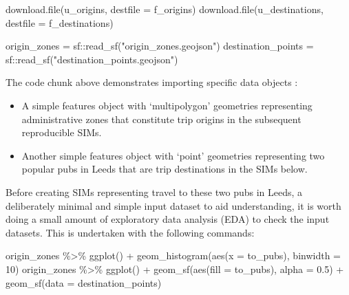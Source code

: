 \documentclass[11pt,letterpaper]{article}
\newenvironment{Shaded}{\begin{snugshade}}{\end{snugshade}}
\newcommand{\AttributeTok}[1]{\textcolor[rgb]{0.77,0.63,0.00}{#1}}
\newcommand{\DecValTok}[1]{\textcolor[rgb]{0.00,0.00,0.81}{#1}}
\newcommand{\FloatTok}[1]{\textcolor[rgb]{0.00,0.00,0.81}{#1}}
\newcommand{\FunctionTok}[1]{\textcolor[rgb]{0.00,0.00,0.00}{#1}}
\newcommand{\NormalTok}[1]{#1}
\newcommand{\OtherTok}[1]{\textcolor[rgb]{0.56,0.35,0.01}{#1}}
\newcommand{\SpecialCharTok}[1]{\textcolor[rgb]{0.00,0.00,0.00}{#1}}
\newcommand{\StringTok}[1]{\textcolor[rgb]{0.31,0.60,0.02}{#1}}
\begin{document}
\begin{Shaded}
\begin{Highlighting}[]
\FunctionTok{download.file}\NormalTok{(u\_origins, }\AttributeTok{destfile =}\NormalTok{ f\_origins)}
\FunctionTok{download.file}\NormalTok{(u\_destinations, }\AttributeTok{destfile =}\NormalTok{ f\_destinations)}
\end{Highlighting}
\end{Shaded}

\begin{Shaded}
\begin{Highlighting}[]
\NormalTok{origin\_zones }\OtherTok{=}\NormalTok{ sf}\SpecialCharTok{::}\FunctionTok{read\_sf}\NormalTok{(}\StringTok{"origin\_zones.geojson"}\NormalTok{)}
\NormalTok{destination\_points }\OtherTok{=}\NormalTok{ sf}\SpecialCharTok{::}\FunctionTok{read\_sf}\NormalTok{(}\StringTok{"destination\_points.geojson"}\NormalTok{)}
\end{Highlighting}
\end{Shaded}

The code chunk above demonstrates importing specific data objects :

\begin{itemize}
\item
  A simple features object with `multipolygon' geometries representing administrative zones that constitute trip origins in the subsequent reproducible SIMs.
\item
  Another simple features object with `point' geometries representing two popular pubs in Leeds that are trip destinations in the SIMs below.
\end{itemize}

Before creating SIMs representing travel to these two pubs in Leeds, a deliberately minimal and simple input dataset to aid understanding, it is worth doing a small amount of exploratory data analysis (EDA) to check the input datasets.
This is undertaken with the following commands:

\begin{Shaded}
\begin{Highlighting}[]
\NormalTok{origin\_zones }\SpecialCharTok{\%\textgreater{}\%} 
  \FunctionTok{ggplot}\NormalTok{() }\SpecialCharTok{+}
  \FunctionTok{geom\_histogram}\NormalTok{(}\FunctionTok{aes}\NormalTok{(}\AttributeTok{x =}\NormalTok{ to\_pubs), }\AttributeTok{binwidth =} \DecValTok{10}\NormalTok{)}
\NormalTok{origin\_zones }\SpecialCharTok{\%\textgreater{}\%} 
  \FunctionTok{ggplot}\NormalTok{() }\SpecialCharTok{+}
  \FunctionTok{geom\_sf}\NormalTok{(}\FunctionTok{aes}\NormalTok{(}\AttributeTok{fill =}\NormalTok{ to\_pubs), }\AttributeTok{alpha =} \FloatTok{0.5}\NormalTok{) }\SpecialCharTok{+}
  \FunctionTok{geom\_sf}\NormalTok{(}\AttributeTok{data =}\NormalTok{ destination\_points)}
\end{Highlighting}
\end{Shaded}
\end{document}
